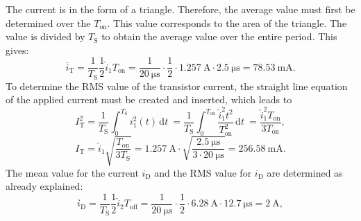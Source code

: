 \begin{solutionblock}
    The current is in the form of a triangle. Therefore, the average value must first be determined over the $T_\mathrm{on}$. This value corresponds to the area of the triangle. The value is divided by $T_\mathrm{S}$ to obtain the average value over the entire period. This gives:
    \begin{equation}
        \overline{i}_\mathrm{T} = \frac{1}{T_\mathrm{S}}\frac{1}{2}\hat i_\mathrm{1}T_\mathrm{on}=\frac{1}{\SI{20}{\micro\s}}\cdot\frac{1}{2}\cdot\SI{1.257}{\ampere}\cdot\SI{2.5}{\micro\s}=\SI{78.53}{\milli\ampere}.
    \end{equation}
    To determine the RMS value of the transistor current, the straight line equation of the applied current must be created and inserted, which leads to
    \begin{equation}
        I_\mathrm{T}^2=\frac{1}{T_\mathrm{S}} \int_{0}^{T_\mathrm{S}} i_\mathrm{1}^2(t) \,\mathrm{d}t \ = \frac{1}{T_\mathrm{S}}\int_{0}^{T_\mathrm{on}} \frac{\hat i_\mathrm{1}^2t^2}{T_\mathrm{on}^2} \,\mathrm{d}t \ =  \frac{\hat i_\mathrm{1}^2T_\mathrm{on}}{3T_\mathrm{on}},
    \end{equation}
    \begin{equation}
        I_\mathrm{T} = \hat i_\mathrm{1} \sqrt{\frac{T_\mathrm{on}}{3T_\mathrm{S}}}= \SI{1.257}{\ampere}\cdot\sqrt{\frac{\SI{2.5}{\micro\s}}{3\cdot\SI{20}{\micro\s}}}= \SI{256.58}{\milli\ampere}.
    \end{equation}
    The mean value for the current $i_\mathrm{D}$ and the RMS value for  $i_\mathrm{D}$ are determined as already explained:
    \begin{equation}
        \overline{i}_\mathrm{D} = \frac{1}{T_\mathrm{S}}\frac{1}{2}\hat i_\mathrm{2}T_\mathrm{off}=\frac{1}{\SI{20}{\micro\s}}\cdot\frac{1}{2}\cdot\SI{6.28}{\ampere}\cdot\SI{12.7}{\micro\s}=\SI{2}{\ampere},
    \end{equation}


\end{solutionblock}
